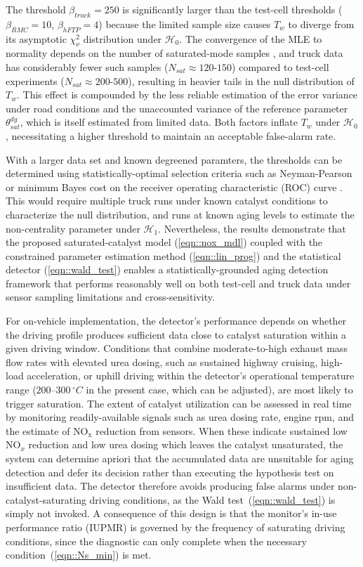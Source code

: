 \documentclass[subscriptcorrection,upint,varvw,barcolor=Goldenrod3,mathalfa=cal=euler,balance,hyphenate,french,pdf-a]{asmejour}
\newcommand{\nox}{\text{NO}_{\text{x}}}
\begin{document}
The threshold $\beta_{truck} = 250$ is significantly larger than the test-cell thresholds ($\beta_{RMC} = 10$,
$\beta_{hFTP} = 4$) because the limited sample size causes $T_w$ to diverge from its asymptotic $\chi^2_\nu$
distribution under $\mathcal{H}_0$. The convergence of the MLE to normality depends on the number of saturated-mode
samples \cite{kay1993estimation}, and truck data has considerably fewer such samples ($N_{sat} \approx 120$-$150$)
compared to test-cell experiments ($N_{sat} \approx 200$-$500$), resulting in heavier tails in the null distribution of
$T_w$. This effect is compounded by the less reliable estimation of the error variance under road conditions and the
unaccounted variance of the reference parameter $\theta_{sat}^{dg}$, which is itself estimated from limited data. Both
factors inflate $T_w$ under $\mathcal{H}_0$, necessitating a higher threshold to maintain an acceptable false-alarm
rate.

With a larger data set and known degreened paramters, the thresholds can be determined using statistically-optimal
selection criteria such as Neyman-Pearson \cite{kay1998detection} or minimum Bayes cost on the receiver operating
characteristic (ROC) curve \cite{PoorDetection}. This would require multiple truck runs under known catalyst conditions
to characterize the null distribution, and runs at known aging levels to estimate the non-centrality parameter under
$\mathcal{H}_1$. Nevertheless, the results demonstrate that the proposed saturated-catalyst model (\ref{eqn::nox_mdl})
coupled with the constrained parameter estimation method (\ref{eqn::lin_prog}) and the statistical detector
(\ref{eqn::wald_test}) enables a statistically-grounded aging detection framework that performs reasonably well on both
test-cell and truck data under sensor sampling limitations and cross-sensitivity.

For on-vehicle implementation, the detector's performance depends on whether the driving profile produces sufficient
data close to catalyst saturation within a given driving window. Conditions that combine moderate-to-high exhaust mass
flow rates with elevated urea dosing, such as sustained highway cruising, high-load acceleration, or uphill driving
within the detector's operational temperature range ($200$--$300\,^\circ C$ in the present case, which can be adjusted),
are most likely to trigger saturation. The extent of catalyst utilization can be assessed in real time by monitoring
readily-available signals such as urea dosing rate, engine rpm, and the estimate of $\nox$ reduction from sensors. When
these indicate sustained low $\text{NO}_x$ reduction and low urea dosing which leaves the catalyst unsaturated, the
system can determine apriori that the accumulated data are unsuitable for aging detection and defer its decision rather
than executing the hypothesis test on insufficient data. The detector therefore avoids producing false alarms under
non-catalyst-saturating driving conditions, as the Wald test~(\ref{eqn::wald_test}) is simply not invoked. A consequence
of this design is that the monitor's in-use performance ratio (IUPMR) is governed by the frequency of saturating driving
conditions, since the diagnostic can only complete when the necessary condition~(\ref{eqn::Ns_min}) is met.
\end{document}
